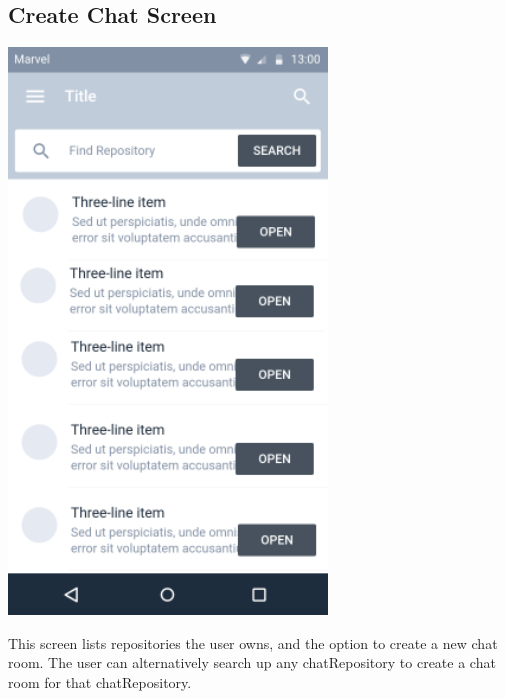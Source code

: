 \documentclass{report}
\begin{document}
\subsection{Create Chat Screen}
\begin{center}
    \includegraphics[scale=0.5]{design-create-chat}
\end{center}
This screen lists repositories the user owns, and the option to create a new chat room. The user can alternatively search up any chatRepository to create a chat room for that chatRepository.

\newpage
\end{document}
